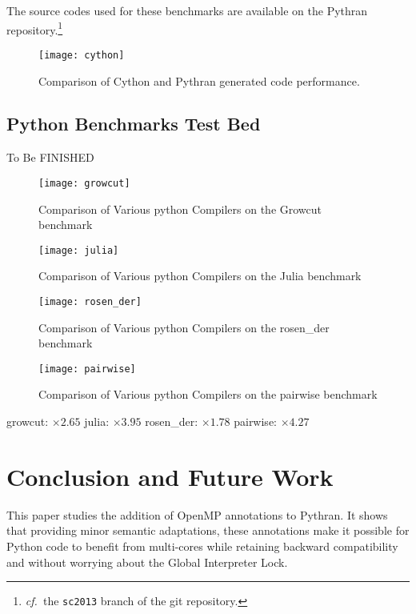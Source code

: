 \documentclass[conference]{IEEEtran}
\newcommand\see{\emph{cf.\ }}
\begin{document}
The source codes used for these benchmarks are available on the Pythran
repository.\footnote{\see the \texttt{sc2013} branch of the git repository.} 

\begin{figure}[ht]
    \texttt{[image: cython]}
    \caption{Comparison of Cython and Pythran generated code performance.}
    \label{fig:cython-pythran}
\end{figure}


\subsection{Python Benchmarks Test Bed}

To Be FINISHED

\begin{figure}[ht]
    \texttt{[image: growcut]}
    \caption{Comparison of Various python Compilers on the Growcut benchmark}
    \label{fig:pb-growcut}
\end{figure}

\begin{figure}[ht]
    \texttt{[image: julia]}
    \caption{Comparison of Various python Compilers on the Julia benchmark}
    \label{fig:pb-julia}
\end{figure}

\begin{figure}[ht]
    \texttt{[image: rosen\_der]}
    \caption{Comparison of Various python Compilers on the rosen\_der benchmark}
    \label{fig:pb-rosen}
\end{figure}

\begin{figure}[ht]
    \texttt{[image: pairwise]}
    \caption{Comparison of Various python Compilers on the pairwise benchmark}
    \label{fig:pb-pairwise}
\end{figure}
growcut: $\times 2.65$
julia: $\times 3.95$
rosen\_der: $\times 1.78$
pairwise: $\times 4.27$


\section{Conclusion and Future Work}

This paper studies the addition of OpenMP annotations to Pythran. It shows that
providing minor semantic adaptations, these annotations make it possible for
Python code to benefit from multi-cores while retaining backward compatibility
and without worrying about the Global Interpreter Lock.
\end{document}
